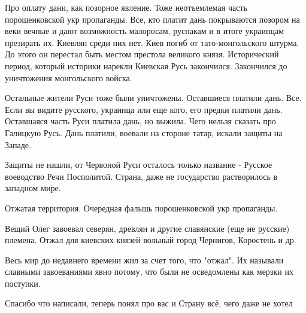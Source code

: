 \begin{itemize}
\begin{itemize}


Про оплату дани, как позорное явление. Тоже неотъемлемая часть порошенковской
укр пропаганды. Все, кто платит дань покрываются позором на веки вечные и дают
возможность малоросам, руснакам и в итоге украинцам презирать их. Киевлян среди
них нет. Киев погиб от тато-монгольского штурма. До этого он перестал быть
местом престола великого князя. Исторический период, который историки нарекли
Киевская Русь закончился. Закончился до уничтожения монгольского войска.

Остальные жители Руси тоже были уничтожены. Оставшиеся платили дань. Все. Если
вы видите русского, украинца или еще кого, его предки платили дань. Оставшаяся
часть Руси платила дань, но выжила. Чего нельзя сказать про Галицкую Русь. Дань
платили, воевали на стороне татар, искали защиты на Западе.

Защиты не нашли, от Червоной Руси осталось только название - Русское воеводство
Речи Посполитой. Страна, даже не государство растворилось в западном мире.


Отжатая территория. Очередная фальшь порошенковской укр пропаганды.

Вещий Олег завоевал северян, древлян и другие славянские (еще не русские)
племена. Отжал для киевских князей вольный город Чернигов, Коростень и др.

Весь мир до недавнего времени жил за счет того, что "отжал". Их называли
славными завоеваниями явно потому, что были не осведомлены как мерзки их
поступки.
\end{itemize}

 
Спасибо что написали, теперь понял про вас и Страну всё, чего даже не хотел \Smiley[1.0][yellow]

 

\end{itemize}
